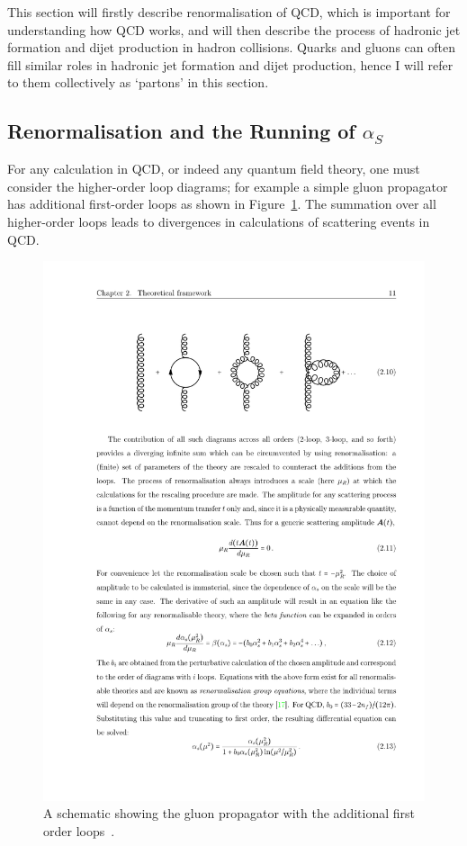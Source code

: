 This section will firstly describe renormalisation of QCD, which is important for understanding how QCD works,
and will then describe the process of hadronic jet formation and dijet production in hadron collisions.
Quarks and gluons can often fill similar roles in hadronic jet formation and dijet production, hence I will refer to them collectively as `partons' in this section.

\subsection{Renormalisation and the Running of $\alpha_S$}
\label{sec:theo-qcd_dijet_running}

For any calculation in QCD, or indeed any quantum field theory, one must consider the higher-order loop diagrams;
for example a simple gluon propagator has additional first-order loops as shown in Figure~\ref{fig:theo-qcd_gluon}.
The summation over all higher-order loops leads to divergences in calculations of scattering events in QCD.

\begin{figure}[!hbt]
  \begin{center}
    \includegraphics[width=0.7\linewidth, angle=0]{figs/Theory/qcd_gluon_loop.pdf}
  \end{center}
  \caption[A schematic showing the gluon propagator with the additional first order loops.]
  {A schematic showing the gluon propagator with the additional first order loops~\cite{det-thesis_kate}.}
  \label{fig:theo-qcd_gluon}
\end{figure}

